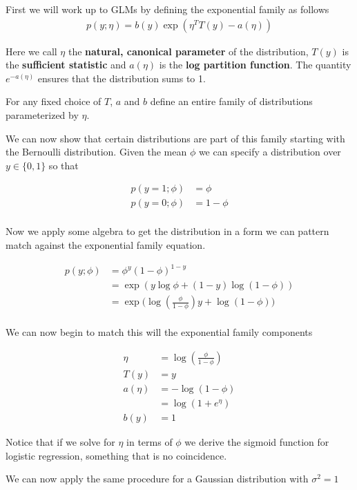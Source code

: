 \documentclass[11pt]{exam}
\begin{document}
First we will work up to GLMs by defining the exponential family as follows
\begin{align*}
p(y;\eta) = b(y)\exp({\eta^TT(y) - a(\eta)})
\end{align*}

Here we call $\eta$ the \textbf{natural, canonical parameter} of the distribution, $T(y)$ is the \textbf{sufficient statistic} and $a(\eta)$ is the \textbf{log partition function}. The quantity $e^{-a(\eta)}$ ensures that the distribution sums to 1.

For any fixed choice of $T$, $a$ and $b$ define an entire family of distributions parameterized by $\eta$. 

We can now show that certain distributions are part of this family starting with the Bernoulli distribution. Given the mean $\phi$ we can specify a distribution over $y \in \{0,1\}$ so that 

\begin{align*}
p(y = 1; \phi) &= \phi \\
p(y = 0; \phi) &= 1 - \phi \\
\end{align*}

Now we apply some algebra to get the distribution in a form we can pattern match against the exponential family equation.

\begin{align*}
p(y;\phi) &= \phi^y(1-\phi)^{1-y}\\
          &= \exp{(y\log{\phi} + (1-y)\log({1 - \phi}))}\\
          &= \exp({\log({\frac{\phi}{1-\phi}})y + \log({1 - \phi}))}\\ 
\end{align*}

We can now begin to match this will the exponential family components

\begin{align*}
\eta  &= \log(\frac{\phi}{1-\phi})\\
T(y) &= y\\
a(\eta) &= -\log(1 -\phi)\\
        &= \log(1 + e^\eta)\\
b(y)    &= 1
\end{align*}

Notice that if we solve for $\eta$ in terms of $\phi$ we derive the sigmoid function for logistic regression, something that is no coincidence.

We can now apply the same procedure for a Gaussian distribution with $\sigma^2 = 1$
\end{document}
